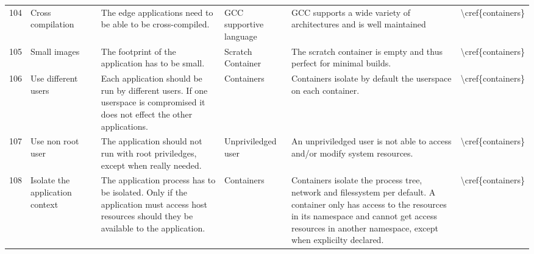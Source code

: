\begin{table}[]
\begin{tabular}{lllllll}
104 & Cross compilation                       &                & The edge applications need to be able to be cross-compiled.                                                                                                                                & GCC supportive language  & GCC supports a wide variety of architectures and is well maintained                                                                                                                                                            & \textbackslash{}cref\{containers\} \\
105 & Small images                            &                & The footprint of the application has to be small.                                                                                                                                          & Scratch Container        & The scratch container is empty and thus perfect for minimal builds.                                                                                                                                                            & \textbackslash{}cref\{containers\} \\
106 & Use different users                     &                & Each application should be run by different users. If one userspace is compromised it does not effect the other applications.                                                              & Containers               & Containers isolate by default the userspace on each container.                                                                                                                                                                 & \textbackslash{}cref\{containers\} \\
107 & Use non root user                       &                & The application should not run with root priviledges, except when really needed.                                                                                                           & Unpriviledged user       & An unpriviledged user is not able to access and/or modify system resources.                                                                                                                                                    & \textbackslash{}cref\{containers\} \\
108 & Isolate the application context         &                & The application process has to be isolated. Only if the application must access host resources should they be available to the application.                                                & Containers               & Containers isolate the process tree, network and filessystem per default. A container only has access to the resources in its namespace and cannot get access resources in another namespace, except when explicilty declared. & \textbackslash{}cref\{containers\} \\

\end{tabular}
\end{table}

